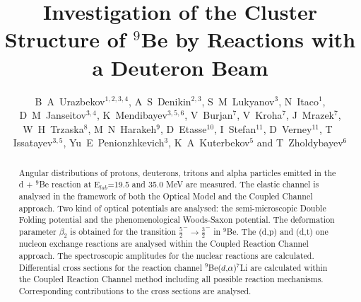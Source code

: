 \documentclass[10pt]{iopart}
\begin{document}
\title[B A Urazbekov \etal ]{Investigation of the Cluster Structure of $^9$Be by Reactions with a Deuteron Beam}

\author{B~A~Urazbekov$^{1,2,3,4}$, A~S~Denikin$^{2,3}$, S~M~Lukyanov$^3$,  N~Itaco$^1$,  D~M~Janseitov$^{3,4}$, K~Mendibayev$^{3,5,6}$, V~Burjan$^7$, V~Kroha$^7$, J~Mrazek$^7$, W~H~Trzaska$^8$, M~N~Harakeh$^9$, D~Etasse$^{10}$, I~Stefan$^{11}$, D~Verney$^{11}$, T~ Issatayev$^{3,5}$, Yu~E~Penionzhkevich$^{3}$, K~A~Kuterbekov$^{5}$ and T~Zholdybayev$^{6}$}

\address{$^1$ Dipartimento di Matematica e Fisica,
Universit\`{a} degli Studi della Campania “Luigi Vanvitelli”, I-8110 Caserta, Italy}
\address{$^2$ Dubna State University, 141982 Dubna, Russia}
\address{$^3$ Joint Institute for nuclear research,  141980 Dubna, Russia}
\address{$^4$ Al-Farabi Kazakh National University, 050040 Almaty, Kazakhstan }
\address{$^5$ L~N~Gumilyov Eurasian National University, 010008 Astana, Kazakhstan }
\address{$^6$ Institute of Nuclear Physics, 050032 Almaty, Kazakhstan}
\address{$^7$ Nuclear Physics Institute CAS, 25068 \v{R}e\v{z}, Czech Republic}
\address{$^8$ Department of Physics, University of Jyv\"askyl\"a, FIN-40014 Jyv\"askyl\"a, Finland}
\address{$^9$ KVI-CART, University of Groningen, 9747 AA Groningen, The Netherlands}
\address{$^{10}$ Normandie Universit\'{e}, ENSICAEN, UNICAEN, CNRS/IN2P3, LPC Caen, 14000 Caen, France}
\address{$^{11}$ Institut de Physique Nucl\'{e}aire, Univ. Paris-Sud, Universit\'{e} Paris-Saclay, F-91406 Orsay, France}

\begin{abstract}
Angular distributions of protons, deuterons, tritons and alpha particles emitted in
the d + $^{9}$Be reaction  at E$_{lab}$=19.5 and 35.0 MeV are measured.
The elastic channel is analysed in the framework of both the Optical Model and  the Coupled Channel approach.
Two kind of optical potentials are analysed: the semi-microscopic Double Folding potential and the phenomenological Woods-Saxon potential.
The deformation parameter $\beta_2$ is obtained for the transition $\frac{5}{2}^{-} \rightarrow \frac{3}{2}^{-} $ in $^9$Be.
The (d,p) and (d,t) one nucleon exchange reactions are analysed within the Coupled Reaction Channel approach.
The spectroscopic amplitudes for the nuclear reactions are calculated. Differential cross sections for the reaction channel ${^9}$Be($d$,$\alpha$)$^7$Li are calculated within the Coupled Reaction Channel method including  all possible reaction mechanisms. Corresponding contributions to the cross sections are analysed.

\end{abstract}
\end{document}
